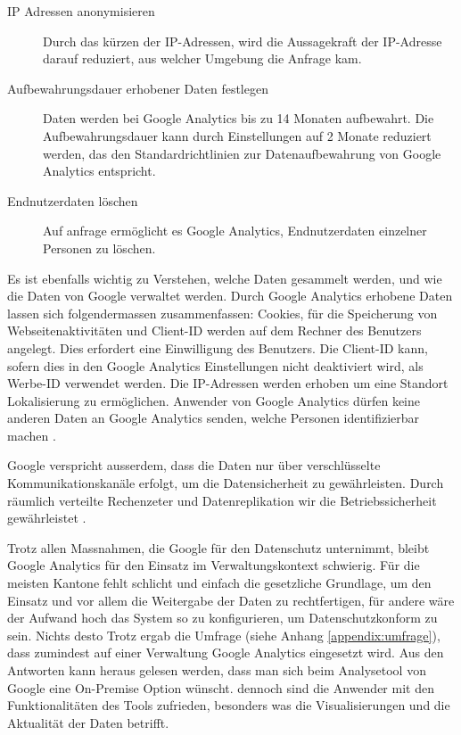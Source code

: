 \begin{description}
  \item[IP Adressen anonymisieren] Durch das kürzen der IP-Adressen, wird die Aussagekraft der IP-Adresse darauf reduziert, aus welcher Umgebung die Anfrage kam.
  \item[Aufbewahrungsdauer erhobener Daten festlegen] Daten werden bei Google Analytics bis zu 14 Monaten aufbewahrt. Die Aufbewahrungsdauer kann durch Einstellungen auf 2 Monate reduziert werden, das den Standardrichtlinien zur Datenaufbewahrung von Google Analytics entspricht.
  \item[Endnutzerdaten löschen] Auf anfrage ermöglicht es Google Analytics, Endnutzerdaten einzelner Personen zu löschen.   
\end{description}

Es ist ebenfalls wichtig zu Verstehen, welche Daten gesammelt werden, und wie die Daten von Google verwaltet werden. Durch Google Analytics erhobene Daten lassen sich folgendermassen zusammenfassen: Cookies, für die Speicherung von Webseitenaktivitäten und Client-ID werden auf dem Rechner des Benutzers angelegt. Dies erfordert eine Einwilligung des Benutzers. Die Client-ID kann, sofern dies in den Google Analytics Einstellungen nicht deaktiviert wird, als Werbe-ID verwendet werden. Die IP-Adressen werden erhoben um eine Standort Lokalisierung zu ermöglichen. Anwender von Google Analytics dürfen keine anderen Daten an Google Analytics senden, welche Personen identifizierbar machen \parencite{GoogleAnalyticsDatenschutz}.

Google verspricht ausserdem, dass die Daten nur über verschlüsselte Kommunikationskanäle erfolgt, um die Datensicherheit zu gewährleisten. Durch räumlich verteilte Rechenzeter und Datenreplikation wir die Betriebssicherheit gewährleistet \parencite{GoogleAnalyticsDatenschutz}.

Trotz allen Massnahmen, die Google für den Datenschutz unternimmt, bleibt Google Analytics für den Einsatz im Verwaltungskontext schwierig. Für die meisten Kantone fehlt schlicht und einfach die gesetzliche Grundlage, um den Einsatz und vor allem die Weitergabe der Daten zu rechtfertigen, für andere wäre der Aufwand hoch das System so zu konfigurieren, um Datenschutzkonform zu sein. Nichts desto Trotz ergab die Umfrage (siehe Anhang \ref{appendix:umfrage}), dass zumindest auf einer Verwaltung Google Analytics eingesetzt wird. Aus den Antworten kann heraus gelesen werden, dass man sich beim Analysetool von Google eine On-Premise Option wünscht. dennoch sind die Anwender mit den Funktionalitäten des Tools zufrieden, besonders was die Visualisierungen und die Aktualität der Daten betrifft.


